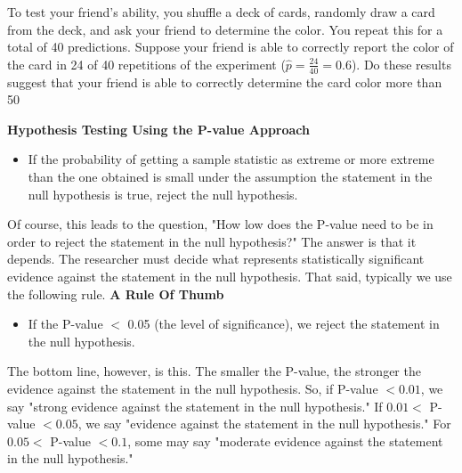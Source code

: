 \documentclass{report}
\begin{document}
    \bigbreak \noindent 
    To test your friend's ability, you shuffle a deck of cards, randomly draw a card from the deck, and ask your friend to determine the color. You repeat this for a total of 40 predictions. Suppose your friend is able to correctly report the color of the card in 24 of 40 repetitions of the experiment ($\hat{p}=\frac{24}{40}=0.6$). Do these results suggest that your friend is able to correctly determine the card color more than 50%

    \bigbreak \noindent 
    \textbf{Hypothesis Testing Using the P-value Approach}
    \begin{itemize}
        \item If the probability of getting a sample statistic as extreme or more extreme than the one obtained is small under the assumption the statement in the null hypothesis is true, reject the null hypothesis.
    \end{itemize}
    \bigbreak \noindent 
    Of course, this leads to the question, "How low does the P-value need to be in order to reject the statement in the null hypothesis?" The answer is that it depends. The researcher must decide what represents statistically significant evidence against the statement in the null hypothesis. That said, typically we use the following rule.
    \bigbreak \noindent 
    \textbf{A Rule Of Thumb}
    \begin{itemize}
        \item If the P-value $<$ 0.05 (the level of significance), we reject the statement in the null hypothesis.
    \end{itemize}
    \bigbreak \noindent 
    The bottom line, however, is this. The smaller the P-value, the stronger the evidence against the statement in the null hypothesis. So, if P-value $<0.01$, we say "strong evidence against the statement in the null hypothesis." If $0.01<$ P-value $<0.05$, we say "evidence against the statement in the null hypothesis." For $0.05<$ P-value $<0.1$, some may say "moderate evidence against the statement in the null hypothesis."
\end{document}

